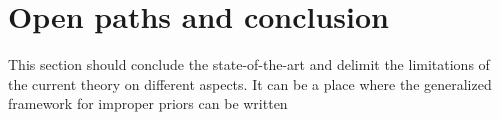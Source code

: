 

\section{Open paths and conclusion}


This section should conclude the state-of-the-art and delimit the limitations of the current theory on different aspects. 
It can be a place where the generalized framework for improper priors can be written











